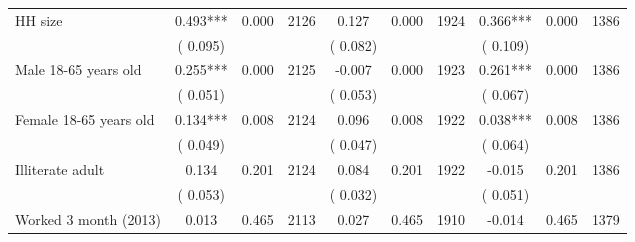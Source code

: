 \begin{tabular}{l*{9}{c}}
 HH size                 &              0.493***          &        0.000 & 2126          &              0.127 &        0.000 & 1924                   &        0.366*** &        0.000 & 1386                                 \\ 
                               &        (       0.095) & &                                                                 &       (       0.082) & &                                                          &       (       0.109) & &                                          \\ 
 Male 18-65 years old                 &              0.255***          &        0.000 & 2125          &             -0.007 &        0.000 & 1923                   &        0.261*** &        0.000 & 1386                                 \\ 
                               &        (       0.051) & &                                                                 &       (       0.053) & &                                                          &       (       0.067) & &                                          \\ 
 Female 18-65 years old                 &              0.134***          &        0.008 & 2124          &              0.096 &        0.008 & 1922                   &        0.038*** &        0.008 & 1386                                 \\ 
                               &        (       0.049) & &                                                                 &       (       0.047) & &                                                          &       (       0.064) & &                                          \\ 
 Illiterate adult                 &              0.134          &        0.201 & 2124          &              0.084 &        0.201 & 1922                   &       -0.015 &        0.201 & 1386                                 \\ 
                               &        (       0.053) & &                                                                 &       (       0.032) & &                                                          &       (       0.051) & &                                          \\ 
 Worked 3 month (2013)                 &              0.013          &        0.465 & 2113          &              0.027 &        0.465 & 1910                   &       -0.014 &        0.465 & 1379                                 \\ 

\end{tabular}
